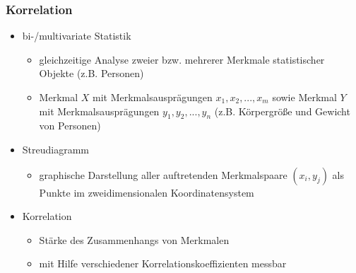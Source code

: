 \documentclass{beamer}
\begin{document}
\begin{frame}
	
	\frametitle{Korrelation}
	
	\begin{itemize}
		
		\item bi-/multivariate Statistik
		\begin{itemize}
			\item gleichzeitige Analyse zweier bzw. mehrerer Merkmale statistischer Objekte (z.B. Personen)
			\item Merkmal $X$ mit Merkmalsauspr\"agungen $x_1, x_2, ..., x_m$ sowie Merkmal $Y$ mit Merkmalsauspr\"agungen $y_1, y_2, ..., y_n$ (z.B. K\"orpergr\"o\ss e und Gewicht von Personen)
		\end{itemize}
		
		\item Streudiagramm
		\begin{itemize}
			\item graphische Darstellung aller auftretenden Merkmalspaare $(x_i,y_j)$ als Punkte im zweidimensionalen Koordinatensystem
		\end{itemize}

		\item Korrelation
		\begin{itemize}
			\item St\"arke des Zusammenhangs von Merkmalen
			\item mit Hilfe verschiedener Korrelationskoeffizienten messbar
		\end{itemize}
		
	\end{itemize}
	
\end{frame}
\end{document}

